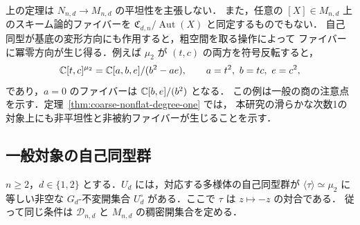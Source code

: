 \begin{remark}[粗空間上のファイバーとの区別]
\label{rem:coarse-fiber-warning}
上の定理は $N_{n,d}\to M_{n,d}$ の平坦性を主張しない．
また，任意の $[X]\in M_{n,d}$ 上のスキーム論的ファイバーを
$\mathfrak C_{d,n}/\operatorname{Aut}(X)$ と同定するものでもない．
自己同型が基底の変形方向にも作用すると，粗空間を取る操作によって
ファイバーに冪零方向が生じ得る．例えば $\mu_2$ が $(t,c)$ の両方を符号反転すると，
\[
 \mathbb C[t,c]^{\mu_2}
 =\mathbb C[a,b,e]/(b^2-ae),\qquad a=t^2,\ b=tc,\ e=c^2,
\]
であり，$a=0$ のファイバーは $\mathbb C[b,e]/(b^2)$ となる．
この例は一般の商の注意点を示す．定理~\ref{thm:coarse-nonflat-degree-one} では，
本研究の滑らかな次数1の対象上にも非平坦性と非被約ファイバーが生じることを示す．
\end{remark}

\subsection{一般対象の自己同型群}

\begin{proposition}[被覆の対合だけを持つ稠密開集合]
\label{prop:generic-deck-stabilizer}
$n\geq2$，$d\in\{1,2\}$ とする．$U_d$ には，対応する多様体の自己同型群が
$\langle\tau\rangle\simeq\mu_2$ に等しい非空な $G_d$-不変開集合
$U_d^{\circ}$ がある．ここで $\tau$ は $z\mapsto-z$ の対合である．
従って同じ条件は $\mathcal D_{n,d}$ と $M_{n,d}$ の稠密開集合を定める．
\end{proposition}


